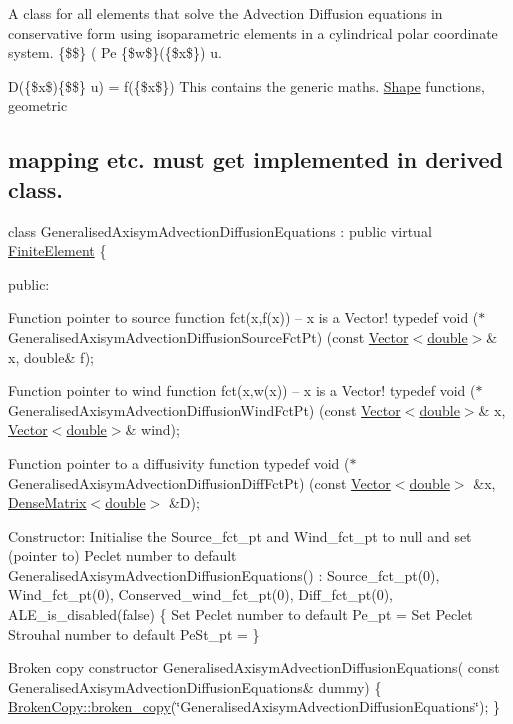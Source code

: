 A class for all elements that solve the Advection Diffusion equations in conservative form using isoparametric elements in a cylindrical polar coordinate system. \{\$\$\} ( Pe \{\$w\$\}(\{\$x\$\}) u. 


\begin{DoxyItemize}
\item D(\{\$x\$)\{\$\$\} u) = f(\{\$x\$\}) This contains the generic maths. \hyperlink{classoomph_1_1Shape}{Shape} functions, geometric \subsection*{mapping etc. must get implemented in derived class. }
\end{DoxyItemize}

class Generalised\+Axisym\+Advection\+Diffusion\+Equations \+: public virtual \hyperlink{classoomph_1_1FiniteElement}{Finite\+Element} \{

public\+:

Function pointer to source function fct(x,f(x)) -- x is a Vector! typedef void ($\ast$\+Generalised\+Axisym\+Advection\+Diffusion\+Source\+Fct\+Pt) (const \hyperlink{classoomph_1_1Vector}{Vector$<$double$>$}\& x, double\& f);

Function pointer to wind function fct(x,w(x)) -- x is a Vector! typedef void ($\ast$\+Generalised\+Axisym\+Advection\+Diffusion\+Wind\+Fct\+Pt) (const \hyperlink{classoomph_1_1Vector}{Vector$<$double$>$}\& x, \hyperlink{classoomph_1_1Vector}{Vector$<$double$>$}\& wind);

Function pointer to a diffusivity function typedef void ($\ast$\+Generalised\+Axisym\+Advection\+Diffusion\+Diff\+Fct\+Pt) (const \hyperlink{classoomph_1_1Vector}{Vector$<$double$>$} \&x, \hyperlink{classoomph_1_1DenseMatrix}{Dense\+Matrix$<$double$>$} \&D);

Constructor\+: Initialise the Source\+\_\+fct\+\_\+pt and Wind\+\_\+fct\+\_\+pt to null and set (pointer to) Peclet number to default Generalised\+Axisym\+Advection\+Diffusion\+Equations() \+: Source\+\_\+fct\+\_\+pt(0), Wind\+\_\+fct\+\_\+pt(0), Conserved\+\_\+wind\+\_\+fct\+\_\+pt(0), Diff\+\_\+fct\+\_\+pt(0), A\+L\+E\+\_\+is\+\_\+disabled(false) \{ Set Peclet number to default Pe\+\_\+pt =  Set Peclet Strouhal number to default Pe\+St\+\_\+pt =  \}

Broken copy constructor Generalised\+Axisym\+Advection\+Diffusion\+Equations( const Generalised\+Axisym\+Advection\+Diffusion\+Equations\& dummy) \{ \hyperlink{namespaceoomph_1_1BrokenCopy_a7e5cd7fda8b8c790003151bee77a84ac}{Broken\+Copy\+::broken\+\_\+copy}(\char`\"{}\+Generalised\+Axisym\+Advection\+Diffusion\+Equations\char`\"{}); \}

